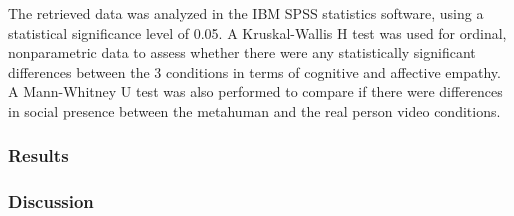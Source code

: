 
The retrieved data was analyzed in the IBM SPSS statistics software, using a statistical significance level of 0.05.
A Kruskal-Wallis H test was used for ordinal, nonparametric data to assess whether there were any statistically significant differences between the 3 conditions in terms of cognitive and affective empathy. A Mann-Whitney U test was also performed to compare if there were differences in social presence between the metahuman and the real person video conditions.

\subsubsection{Results}


\subsubsection{Discussion}

